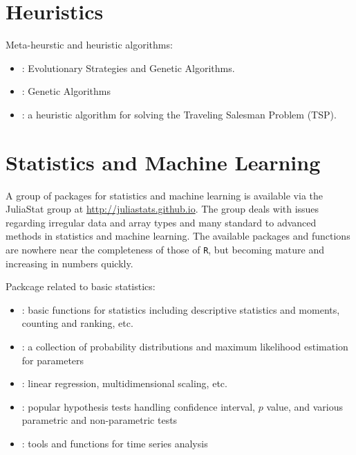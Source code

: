 \section{Heuristics}

Meta-heurstic and heuristic algorithms:
\begin{itemize}
\item \href{https://github.com/wildart/Evolutionary.jl}{}: Evolutionary Strategies and Genetic Algorithms.
\item \href{https://github.com/WestleyArgentum/GeneticAlgorithms.jl}{}: Genetic Algorithms
\item \href{https://github.com/evanfields/TravelingSalesmanHeuristics.jl}{}: a heuristic algorithm for solving the Traveling Salesman Problem (TSP).  
\end{itemize}


\section{Statistics and Machine Learning}

A group of packages for statistics and machine learning is available via the JuliaStat group at \url{http://juliastats.github.io}. The group deals with issues regarding irregular data and array types and many standard to advanced methods in statistics and machine learning. The available packages and functions are nowhere near the completeness of those of \texttt{R}, but becoming mature and increasing in numbers quickly.

Packcage related to basic statistics:
\begin{itemize}
\item \href{https://github.com/JuliaStats/StatsBase.jl}{}: basic functions for statistics including descriptive statistics and moments, counting and ranking, etc.
\item \href{https://github.com/JuliaStats/Distributions.jl}{}: a collection of probability distributions and maximum likelihood estimation for parameters
\item \href{https://github.com/JuliaStats/MultivariateStats.jl}{}: linear regression, multidimensional scaling, etc.
\item \href{https://github.com/JuliaStats/HypothesisTests.jl}{}: popular hypothesis tests handling confidence interval, $p$ value, and various parametric and non-parametric tests
\item \href{https://github.com/JuliaStats/TimeSeries.jl}{}: tools and functions for time series analysis
\end{itemize}

